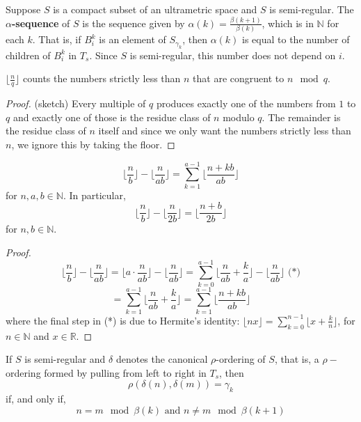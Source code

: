 \begin{definition*}
Suppose $S$ is a compact subset of an ultrametric space and $S$ is semi-regular. The \textbf{$\alpha$-sequence} of $S$ is the sequence given by $\alpha(k)=\frac{\beta(k+1)}{\beta(k)}$, which is in $\mathbb{N}$ for each $k$. That is, if $B^k_i$ is an element of $S_{\gamma_k}$, then $\alpha(k)$ is equal to the number of children of $B^k_i$ in $T_s$. Since $S$ is semi-regular, this number does not depend on $i$.
\end{definition*}


\begin{lemma*}
$\lfloor\frac{n}{q} \rfloor$ counts the numbers strictly less than $n$ that are congruent to $n \mod q$.
\end{lemma*}

\begin{proof}
(sketch) Every multiple of $q$ produces exactly one of the numbers from $1$ to $q$ and exactly one of those is the residue class of $n$ modulo $q$. The remainder is the residue class of $n$ itself and since we only want the numbers strictly less than $n$, we ignore this by taking the floor.
\end{proof}


\begin{lemma*}
\[\lfloor\frac{n}{b} \rfloor - \lfloor \frac{n}{ab} \rfloor = \sum_{k=1}^{a-1} \lfloor \frac{n + kb}{ab} \rfloor\] for $n,a,b \in \mathbb{N}$. In particular, 
\[\lfloor\frac{n}{b} \rfloor - \lfloor \frac{n}{2b} \rfloor= \lfloor \frac{n+b}{2b} \rfloor\] for  $n,b \in \mathbb{N}$.
\end{lemma*}

\begin{proof}
\[\lfloor\frac{n}{b} \rfloor - \lfloor \frac{n}{ab} \rfloor = \lfloor a \cdot \frac{n}{ab} \rfloor - \lfloor \frac{n}{ab} \rfloor  = \sum_{k=0}^{a-1} \lfloor \frac{n}{ab} + \frac{k}{a} \rfloor - \lfloor \frac{n}{ab} \rfloor \text{ (*)}\]
\[= \sum_{k=1}^{a-1} \lfloor \frac{n}{ab} + \frac{k}{a} \rfloor = \sum_{k=1}^{a-1} \lfloor \frac{n + kb}{ab} \rfloor \]
where the final step in (*) is due to Hermite's identity: $\lfloor nx \rfloor = \sum_{k=0}^{n-1} \lfloor x + \frac{k}{n} \rfloor$, for $n \in \mathbb{N}$ and $x \in \mathbb{R}$.
\end{proof}                                                                                                              

\begin{lemma*}
If $S$ is semi-regular and $\delta$ denotes the canonical $\rho$-ordering of $S$, that is, a $\rho-$ordering formed by pulling from left to right in $T_s$, then \[\rho(\delta(n),\delta(m))=\gamma_k\] if, and only if, \[ n=m \mod \beta(k) \text{  and } n \neq m \mod \beta(k+1)\]
\end{lemma*}

